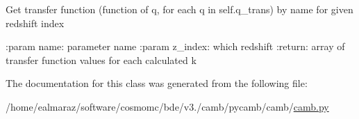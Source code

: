 \begin{DoxyVerb}Get transfer function (function of q, for each q in self.q_trans) by name for given redshift index

:param name:  parameter name
:param z_index: which redshift
:return: array of transfer function values for each calculated k
\end{DoxyVerb}
 

The documentation for this class was generated from the following file\+:\begin{DoxyCompactItemize}
\item 
/home/ealmaraz/software/cosmomc/bde/v3./camb/pycamb/camb/\mbox{\hyperlink{camb_8py}{camb.\+py}}\end{DoxyCompactItemize}
